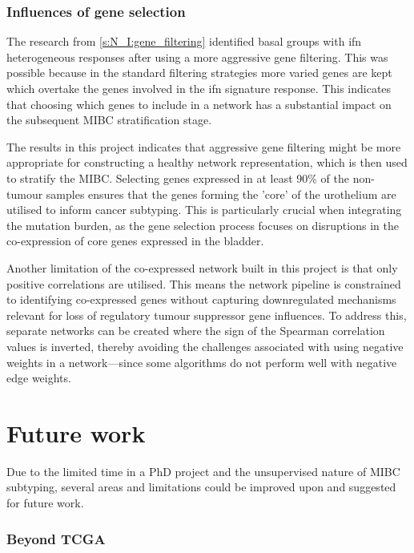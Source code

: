 \subsubsection*{Influences of gene selection}

The research from \cref{s:N_I:gene_filtering} identified basal groups with \acrshort{ifn} heterogeneous responses after using a more aggressive gene filtering. This was possible because in the standard filtering strategies more varied genes are kept which overtake the genes involved in the \acrshort{ifn} signature response. This indicates that choosing which genes to include in a network has a substantial impact on the subsequent MIBC stratification stage. 

The results in this project indicates that aggressive gene filtering might be more appropriate for constructing a healthy network representation, which is then used to stratify the MIBC. Selecting genes expressed in at least 90\% of the non-tumour samples ensures that the genes forming the 'core' of the urothelium are utilised to inform cancer subtyping. This is particularly crucial when integrating the mutation burden, as the gene selection process focuses on disruptions in the co-expression of core genes expressed in the bladder.

Another limitation of the co-expressed network built in this project is that only positive correlations are utilised. This means the network pipeline is constrained to identifying co-expressed genes without capturing downregulated mechanisms relevant for loss of regulatory tumour suppressor gene influences. To address this, separate networks can be created where the sign of the Spearman correlation values is inverted, thereby avoiding the challenges associated with using negative weights in a network—since some algorithms do not perform well with negative edge weights.


\section{Future work} \label{s:future_work}

Due to the limited time in a PhD project and the unsupervised nature of MIBC subtyping, several areas and limitations could be improved upon and suggested for future work.

\subsubsection*{Beyond TCGA}

